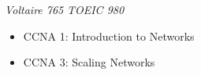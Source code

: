 \documentclass[10pt,a4paper,ragged2e,withhyper]{altacv}
\begin{document}
\begin{paracol}{2}
\textit{Voltaire 765}
\smallbreak
{}
\textit{TOEIC 980}
\smallbreak
{}
\smallbreak
{}
\smallbreak
{}

\begin{itemize}
  \item CCNA 1: Introduction to Networks
  \item CCNA 3: Scaling Networks
\end{itemize}

\end{paracol}
\end{document}
